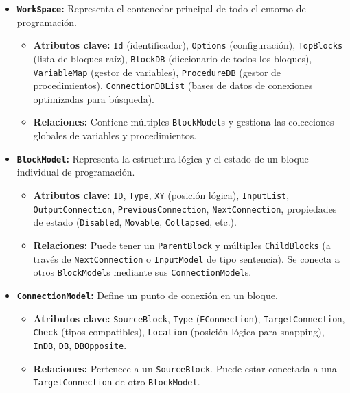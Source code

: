 \begin{itemize}
	\item \textbf{\texttt{WorkSpace}:} Representa el contenedor principal de todo el entorno de programación.
	\begin{itemize}
		\item \textbf{Atributos clave:} \texttt{Id} (identificador), \texttt{Options} (configuración), \texttt{TopBlocks} (lista de bloques raíz), \texttt{BlockDB} (diccionario de todos los bloques), \texttt{VariableMap} (gestor de variables), \texttt{ProcedureDB} (gestor de procedimientos), \texttt{ConnectionDBList} (bases de datos de conexiones optimizadas para búsqueda).
		\item \textbf{Relaciones:} Contiene múltiples \texttt{BlockModel}s y gestiona las colecciones globales de variables y procedimientos.
	\end{itemize}
	
	\item \textbf{\texttt{BlockModel}:} Representa la estructura lógica y el estado de un bloque individual de programación.
	\begin{itemize}
		\item \textbf{Atributos clave:} \texttt{ID}, \texttt{Type}, \texttt{XY} (posición lógica), \texttt{InputList}, \texttt{OutputConnection}, \texttt{PreviousConnection}, \texttt{NextConnection}, propiedades de estado (\texttt{Disabled}, \texttt{Movable}, \texttt{Collapsed}, etc.).
		\item \textbf{Relaciones:} Puede tener un \texttt{ParentBlock} y múltiples \texttt{ChildBlocks} (a través de \texttt{NextConnection} o \texttt{InputModel} de tipo sentencia). Se conecta a otros \texttt{BlockModel}s mediante sus \texttt{ConnectionModel}s.
	\end{itemize}
	
	\item \textbf{\texttt{ConnectionModel}:} Define un punto de conexión en un bloque.
	\begin{itemize}
		\item \textbf{Atributos clave:} \texttt{SourceBlock}, \texttt{Type} (\texttt{EConnection}), \texttt{TargetConnection}, \texttt{Check} (tipos compatibles), \texttt{Location} (posición lógica para snapping), \texttt{InDB}, \texttt{DB}, \texttt{DBOpposite}.
		\item \textbf{Relaciones:} Pertenece a un \texttt{SourceBlock}. Puede estar conectada a una \texttt{TargetConnection} de otro \texttt{BlockModel}.
	\end{itemize}
	

\end{itemize}
